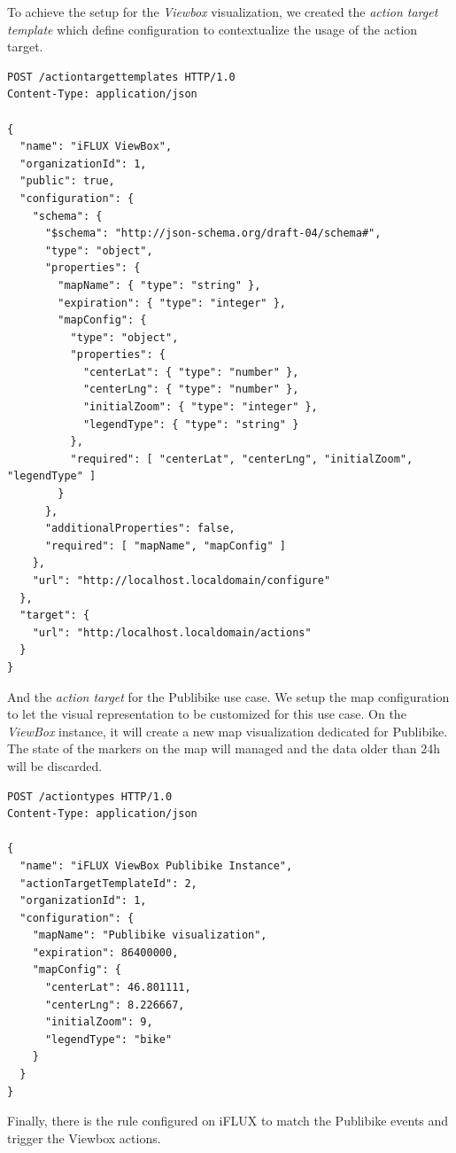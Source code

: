 To achieve the setup for the \emph{Viewbox} visualization, we created the \emph{action target template} which define configuration to contextualize the usage of the action target.

\begin{lstlisting}
POST /actiontargettemplates HTTP/1.0
Content-Type: application/json

{
  "name": "iFLUX ViewBox",
  "organizationId": 1,
  "public": true,
  "configuration": {
    "schema": {
      "$schema": "http://json-schema.org/draft-04/schema#",
      "type": "object",
      "properties": {
        "mapName": { "type": "string" },
        "expiration": { "type": "integer" },
        "mapConfig": {
          "type": "object",
          "properties": {
            "centerLat": { "type": "number" },
            "centerLng": { "type": "number" },
            "initialZoom": { "type": "integer" },
            "legendType": { "type": "string" }
          },
          "required": [ "centerLat", "centerLng", "initialZoom", "legendType" ]
        }
      },
      "additionalProperties": false,
      "required": [ "mapName", "mapConfig" ]
    },
    "url": "http://localhost.localdomain/configure"
  },
  "target": {
    "url": "http:/localhost.localdomain/actions"
  }
}
\end{lstlisting}

And the \emph{action target} for the Publibike use case. We setup the map configuration to let the visual representation to be customized for this use case. On the \emph{ViewBox} instance, it will create a new map visualization dedicated for Publibike. The state of the markers on the map will managed and the data older than 24h will be discarded.

\begin{lstlisting}
POST /actiontypes HTTP/1.0
Content-Type: application/json

{
  "name": "iFLUX ViewBox Publibike Instance",
  "actionTargetTemplateId": 2,
  "organizationId": 1,
  "configuration": {
    "mapName": "Publibike visualization",
    "expiration": 86400000,
    "mapConfig": {
      "centerLat": 46.801111,
      "centerLng": 8.226667,
      "initialZoom": 9,
      "legendType": "bike"
    }
  }
}
\end{lstlisting}

Finally, there is the rule configured on iFLUX to match the Publibike events and trigger the Viewbox actions.

